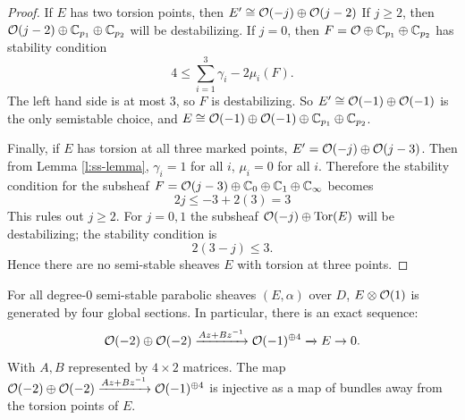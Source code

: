 \begin{proof}
		If $E$ has two torsion points, then $E'\cong \mathcal{O}(-j)\oplus\mathcal{O}(j-2)$ If $j\geq 2$, then $\mathcal{O}(j-2)\oplus \mathbb{C}_{p_1}\oplus \mathbb{C}_{p_2}$ will be destabilizing. If $j=0$, then $F=\mathcal{O}\oplus\mathbb{C}_{p_1}\oplus \mathbb{C}_{p_2}$ has stability condition
		\begin{equation}
			4 \leq \sum_{i=1}^3 \gamma_i - 2\mu_i(F).
		\end{equation}
		The left hand side is at most 3, so $F$ is destabilizing. So $E' \cong \mathcal{O}(-1)\oplus \mathcal{O}(-1)$ is the only semistable choice, and $E \cong \mathcal{O}(-1)\oplus \mathcal{O}(-1)\oplus \mathbb{C}_{p_1} \oplus \mathbb{C}_{p_2}$. 
		
		Finally, if $E$ has torsion at all three marked points, $E' = \mathcal{O}(-j)\oplus \mathcal{O}(j-3)$. Then from Lemma \ref{l:ss-lemma}, $\gamma_i = 1$ for all $i$, $\mu_i = 0$ for all $i$.  Therefore the stability condition for the subsheaf $F=\mathcal{O}(j-3)\oplus\mathbb{C}_{0}\oplus \mathbb{C}_{1}\oplus \mathbb{C}_{\infty}$ becomes
		\begin{equation}
			2j \leq -3 + 2(3) = 3
		\end{equation}
		This rules out $j\geq 2$. For $j=0,1$ the subsheaf $\mathcal{O}(-j)\oplus\text{Tor}(E)$ will be destabilizing; the stability condition is
		\begin{equation}
			2(3-j) \leq 3.
		\end{equation}
		Hence there are no semi-stable sheaves $E$ with torsion at three points.
	\end{proof}
	\begin{theorem}
		\label{t:exactseq}
		For all degree-0 semi-stable parabolic sheaves $(E,\alpha)$ over $D$, $E\otimes \mathcal{O}(1)$ is generated by four global sections. In particular, there is an exact sequence:
		\begin{equation}
		\mathcal{O}(-2)\oplus \mathcal{O}(-2) \xrightarrow{Az+Bz^{-1}} \mathcal{O}(-1)^{\oplus 4} \xrightarrow{} E \to 0.
		\end{equation}
		With $A,B$ represented by $4\times 2$ matrices. The map $\mathcal{O}(-2)\oplus \mathcal{O}(-2) \xrightarrow{Az+Bz^{-1}} \mathcal{O}(-1)^{\oplus 4}$ is injective as a map of bundles away from the torsion points of $E$.
	\end{theorem}
